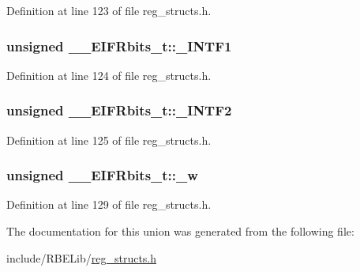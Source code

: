 Definition at line 123 of file reg\+\_\+structs.\+h.

\hypertarget{union_____e_i_f_rbits__t_aa5f09f22c6f0d41fc88cfb0659f348a4}{
\subsubsection[{\+\_\+\+I\+N\+T\+F1}]{\setlength{\rightskip}{0pt plus 5cm}unsigned \+\_\+\+\_\+\+E\+I\+F\+Rbits\+\_\+t\+::\+\_\+\+I\+N\+T\+F1}}\label{union_____e_i_f_rbits__t_aa5f09f22c6f0d41fc88cfb0659f348a4}


Definition at line 124 of file reg\+\_\+structs.\+h.

\hypertarget{union_____e_i_f_rbits__t_a8a9f600ec51872aac52fce7b110257a5}{
\subsubsection[{\+\_\+\+I\+N\+T\+F2}]{\setlength{\rightskip}{0pt plus 5cm}unsigned \+\_\+\+\_\+\+E\+I\+F\+Rbits\+\_\+t\+::\+\_\+\+I\+N\+T\+F2}}\label{union_____e_i_f_rbits__t_a8a9f600ec51872aac52fce7b110257a5}


Definition at line 125 of file reg\+\_\+structs.\+h.

\hypertarget{union_____e_i_f_rbits__t_a451eaa80e8cb4d8d45a2b717b50b141f}{
\subsubsection[{\+\_\+w}]{\setlength{\rightskip}{0pt plus 5cm}unsigned \+\_\+\+\_\+\+E\+I\+F\+Rbits\+\_\+t\+::\+\_\+w}}\label{union_____e_i_f_rbits__t_a451eaa80e8cb4d8d45a2b717b50b141f}


Definition at line 129 of file reg\+\_\+structs.\+h.



The documentation for this union was generated from the following file\+:\begin{DoxyCompactItemize}
\item 
include/\+R\+B\+E\+Lib/\hyperlink{reg__structs_8h}{reg\+\_\+structs.\+h}\end{DoxyCompactItemize}
